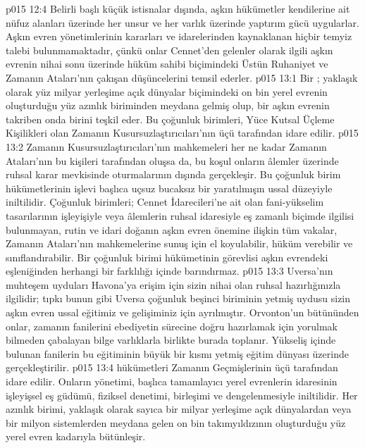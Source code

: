\vs p015 12:4 Belirli başlı küçük istisnalar dışında, aşkın hükümetler kendilerine ait nüfuz alanları üzerinde her unsur ve her varlık üzerinde yaptırım gücü uygularlar. Aşkın evren yönetimlerinin kararları ve idarelerinden kaynaklanan hiçbir temyiz talebi bulunmamaktadır, çünkü onlar Cennet’den gelenler olarak ilgili aşkın evrenin nihai sonu üzerinde hüküm sahibi biçimindeki Üstün Ruhaniyet ve Zamanın Ataları’nın çakışan düşüncelerini temsil ederler.
\vs p015 13:1 Bir ; yaklaşık olarak yüz milyar yerleşime açık dünyalar biçimindeki on bin yerel evrenin oluşturduğu yüz azınlık biriminden meydana gelmiş olup, bir aşkın evrenin takriben onda birini teşkil eder. Bu çoğunluk birimleri, Yüce Kutsal Üçleme Kişilikleri olan Zamanın Kusursuzlaştırıcıları’nın üçü tarafından idare edilir.
\vs p015 13:2 Zamanın Kusursuzlaştırıcıları’nın mahkemeleri her ne kadar Zamanın Ataları’nın bu kişileri tarafından oluşsa da, bu koşul onların âlemler üzerinde ruhsal karar mevkisinde oturmalarının dışında gerçekleşir. Bu çoğunluk birim hükümetlerinin işlevi başlıca uçsuz bucaksız bir yaratılmışın ussal düzeyiyle iniltilidir. Çoğunluk birimleri; Cennet İdarecileri’ne ait olan fani\hyp{}yükselim tasarılarının işleyişiyle veya âlemlerin ruhsal idaresiyle eş zamanlı biçimde ilgilisi bulunmayan, rutin ve idari doğanın aşkın evren önemine ilişkin tüm vakalar, Zamanın Ataları’nın mahkemelerine sunuş için el koyulabilir, hüküm verebilir ve sınıflandırabilir. Bir çoğunluk birimi hükümetinin görevlisi aşkın evrendeki eşleniğinden herhangi bir farklılığı içinde barındırmaz.
\vs p015 13:3 Uversa’nın muhteşem uyduları Havona’ya erişim için sizin nihai olan ruhsal hazırlığınızla ilgilidir; tıpkı bunun gibi Uversa çoğunluk beşinci biriminin yetmiş uydusu sizin aşkın evren ussal eğitimiz ve gelişiminiz için ayrılmıştır. Orvonton’un bütününden onlar, zamanın fanilerini ebediyetin sürecine doğru hazırlamak için yorulmak bilmeden çabalayan bilge varlıklarla birlikte burada toplanır. Yükseliş içinde bulunan fanilerin bu eğitiminin büyük bir kısmı yetmiş eğitim dünyası üzerinde gerçekleştirilir.
\vs p015 13:4  hükümetleri Zamanın Geçmişlerinin üçü tarafından idare edilir. Onların yönetimi, başlıca tamamlayıcı yerel evrenlerin idaresinin işleyişsel eş güdümü, fiziksel denetimi, birleşimi ve dengelenmesiyle iniltilidir. Her azınlık birimi, yaklaşık olarak sayıca bir milyar yerleşime açık dünyalardan veya bir milyon sistemlerden meydana gelen on bin takımyıldızının oluşturduğu yüz yerel evren kadarıyla bütünleşir.

